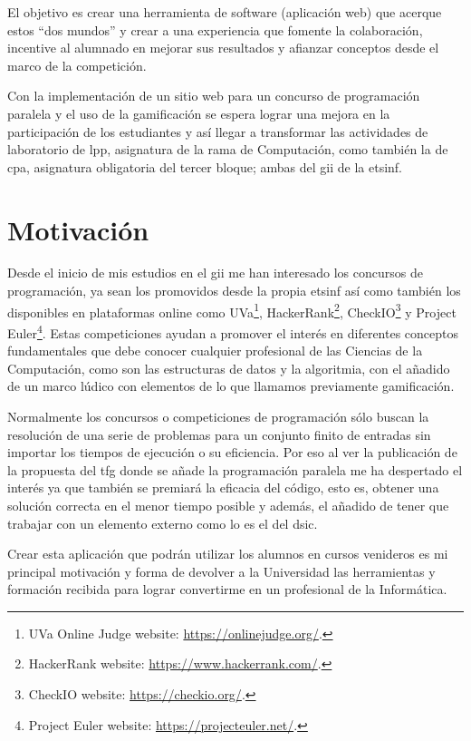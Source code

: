 \documentclass[11pt,spanish,listoffigures,listoftables]{tfgetsinf}
\begin{document}
El objetivo es crear una herramienta de software (aplicación web) que acerque estos ``dos mundos'' y crear a una experiencia que fomente la colaboración, incentive al alumnado en mejorar sus resultados y afianzar conceptos desde el marco de la competición.

Con la implementación de un sitio web para un concurso de programación paralela y el uso de la gamificación se espera lograr una mejora en la participación de los estudiantes y así llegar a transformar las actividades de laboratorio de \acrfull{lpp}, asignatura de la rama de Computación, como también la de \acrfull{cpa}, asignatura obligatoria del tercer bloque; ambas del \acrfull{gii} de la \acrfull{etsinf}. \par

\section{Motivación}

Desde el inicio de mis estudios en el \acrshort{gii} me han interesado los concursos de programación, ya sean los promovidos desde la propia \acrshort{etsinf} así como también los disponibles en plataformas online como UVa\footnote{UVa Online Judge website: \url{https://onlinejudge.org/}.}, HackerRank\footnote{HackerRank website: \url{https://www.hackerrank.com/}.}, CheckIO\footnote{CheckIO website: \url{https://checkio.org/}.} y Project Euler\footnote{Project Euler website: \url{https://projecteuler.net/}.}. Estas competiciones ayudan a promover el interés en diferentes conceptos fundamentales que debe conocer cualquier profesional de las Ciencias de la Computación, como son las estructuras de datos y la algoritmia, con el añadido de un marco lúdico con elementos de lo que llamamos previamente gamificación. \par

Normalmente los concursos o competiciones de programación sólo buscan la resolución de una serie de problemas para un conjunto finito de entradas sin importar los tiempos de ejecución o su eficiencia. Por eso al ver la publicación de la propuesta del \acrfull{tfg} donde se añade la programación paralela me ha despertado el interés ya que también se premiará la eficacia del código, esto es, obtener una solución correcta en el menor tiempo posible y además, el añadido de tener que trabajar con un elemento externo como lo es el  \kahan del \acrfull{dsic}.  \par

Crear esta aplicación que podrán utilizar los alumnos en cursos venideros es mi principal motivación y forma de devolver a la Universidad las herramientas y formación recibida para lograr convertirme en un profesional de la Informática. 
\end{document}
